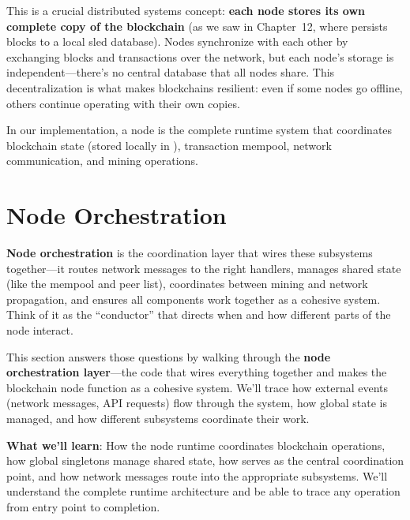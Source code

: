 This is a crucial distributed systems concept: \textbf{each node stores its own complete copy of the blockchain} (as we saw in Chapter~12, where  persists blocks to a local sled database). Nodes synchronize with each other by exchanging blocks and transactions over the network, but each node's storage is independent---there's no central database that all nodes share. This decentralization is what makes blockchains resilient: even if some nodes go offline, others continue operating with their own copies.

In our implementation, a node is the complete runtime system that coordinates blockchain state (stored locally in ), transaction mempool, network communication, and mining operations.

\section{Node Orchestration}
\label{sec:ch09-8-orchestration}

\textbf{Node orchestration} is the coordination layer that wires these subsystems together---it routes network messages to the right handlers, manages shared state (like the mempool and peer list), coordinates between mining and network propagation, and ensures all components work together as a cohesive system. Think of it as the ``conductor'' that directs when and how different parts of the node interact.

This section answers those questions by walking through the \textbf{node orchestration layer}---the code that wires everything together and makes the blockchain node function as a cohesive system. We'll trace how external events (network messages, API requests) flow through the system, how global state is managed, and how different subsystems coordinate their work.

\textbf{What we'll learn}: How the node runtime coordinates blockchain operations, how global singletons manage shared state, how  serves as the central coordination point, and how network messages route into the appropriate subsystems. We'll understand the complete runtime architecture and be able to trace any operation from entry point to completion.


